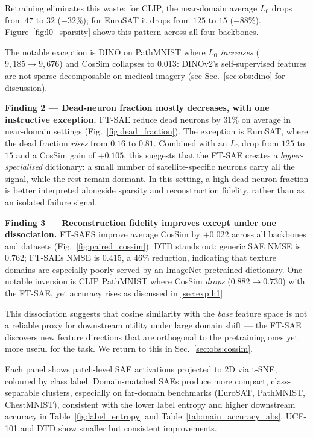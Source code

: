 Retraining eliminates this waste:
for CLIP, the near-domain average $L_0$ drops from $47$ to $32$ ($-32\%$);
for EuroSAT it drops from $125$ to $15$ ($-88\%$).
Figure~\ref{fig:l0_sparsity} shows this pattern across all four backbones.




The notable exception is DINO on PathMNIST where $L_0$ \emph{increases}
($9{,}185 \to 9{,}676$) and CosSim collapses to $0.013$:
DINOv2's self-supervised features are not sparse-decomposable on medical imagery
(see Sec.~\ref{sec:obs:dino} for discussion).

\textbf{Finding 2 — Dead-neuron fraction mostly decreases, with one instructive exception.}
FT-SAE reduce dead neurons by $31\%$ on average in near-domain settings
(Fig.~\ref{fig:dead_fraction}).
The exception is EuroSAT, where the dead fraction \emph{rises} from $0.16$ to $0.81$.
Combined with an $L_0$ drop from $125$ to $15$ and a CosSim gain of $+0.105$,
this suggests that the FT-SAE creates a \emph{hyper-specialised} dictionary:
a small number of satellite-specific neurons carry all the signal,
while the rest remain dormant.
In this setting, a high dead-neuron fraction is better interpreted alongside sparsity and
reconstruction fidelity, rather than as an isolated failure signal.

\textbf{Finding 3 — Reconstruction fidelity improves except under one dissociation.}
FT-SAES improve average CosSim by $+0.022$ across all backbones and datasets
(Fig.~\ref{fig:paired_cossim}).
DTD stands out: generic SAE NMSE is $0.762$; FT-SAEs NMSE is $0.415$,
a 46\% reduction, indicating that texture domains are especially poorly served
by an ImageNet-pretrained dictionary.
One notable inversion is CLIP PathMNIST where CosSim \emph{drops}
($0.882 \to 0.730$) with the FT-SAE, yet accuracy rises as discussed in \ref{sec:exp:h1}

This dissociation suggests that cosine similarity with the \emph{base} feature space
is not a reliable proxy for downstream utility under large domain shift ---
the FT-SAE discovers new feature directions that are orthogonal to the
pretraining ones yet more useful for the task.
We return to this in Sec.~\ref{sec:obs:cossim}.


Each panel shows patch-level SAE activations projected to 2D via t-SNE, coloured by class label.
Domain-matched SAEs produce more compact, class-separable clusters, especially on far-domain benchmarks
(EuroSAT, PathMNIST, ChestMNIST), consistent with the lower label entropy and higher downstream accuracy in
Table~\ref{fig:label_entropy} and Table~\ref{tab:main_accuracy_abs}.
UCF-101 and DTD show smaller but consistent improvements.
\label{fig:tsne}

